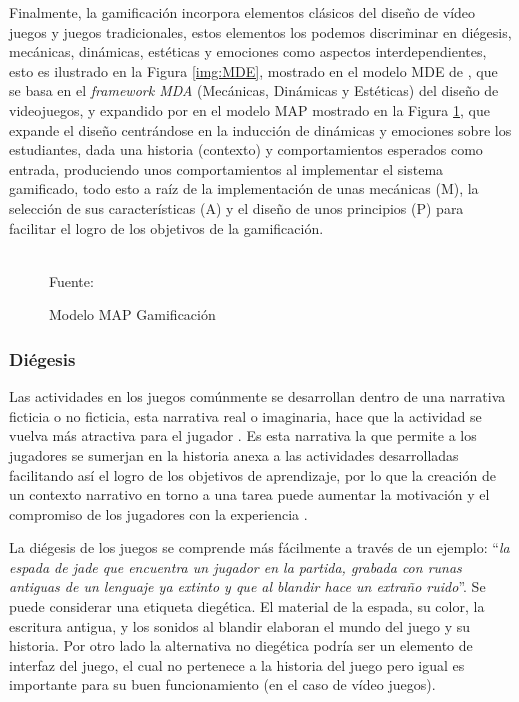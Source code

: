 Finalmente, la gamificación incorpora elementos clásicos del diseño de vídeo juegos y juegos tradicionales,
estos elementos los podemos discriminar en diégesis, mecánicas, dinámicas, estéticas y emociones como aspectos 
interdependientes, esto es ilustrado en la Figura \ref{img:MDE}, mostrado en el modelo MDE de
, que se basa en el {\it framework MDA} (Mecánicas, Dinámicas y Estéticas) del diseño de
videojuegos, y expandido por  en el modelo MAP mostrado en la Figura \ref{img:MAP}, que 
expande el diseño centrándose en la inducción de dinámicas y emociones sobre los estudiantes, dada una 
historia (contexto) y comportamientos esperados como entrada, produciendo unos comportamientos al implementar
el sistema gamificado, todo esto a raíz de la implementación de unas mecánicas (M), la selección de sus 
características (A) y el diseño de unos principios (P) para facilitar el logro de los objetivos de la
gamificación.

\begin{figure}[ht]
\caption{Modelo MAP Gamificación}
\label{img:MAP}
\centering

\\
{\footnotesize Fuente: \citeA<basada en>{CECHELLA2018}}
\end{figure}

\subsubsection{Diégesis}

Las actividades en los juegos comúnmente se desarrollan dentro de una narrativa ficticia o no ficticia, esta 
narrativa real o imaginaria, hace que la actividad se vuelva más atractiva para el jugador
\cite{AURA2021101728}. Es esta narrativa la que permite a los jugadores se sumerjan en la historia 
anexa a las actividades desarrolladas facilitando así el logro de los objetivos de aprendizaje, por lo
que la creación de un contexto narrativo en torno a una tarea puede aumentar la motivación y el compromiso de
los jugadores con la experiencia \cite{CECHELLA2018}.

La diégesis de los juegos se comprende más fácilmente a través de un ejemplo: ``{\it la espada de jade que 
encuentra un jugador en la partida, grabada con runas antiguas de un lenguaje ya extinto y que al blandir 
hace un extraño ruido}''. Se puede considerar una etiqueta diegética. El material de la espada, su color, la 
escritura antigua, y los sonidos al blandir elaboran el mundo del juego y su historia. Por otro lado la 
alternativa no diegética podría ser un elemento de interfaz del juego, el cual no pertenece a la historia del
juego pero igual es importante para su buen funcionamiento (en el caso de vídeo juegos).

